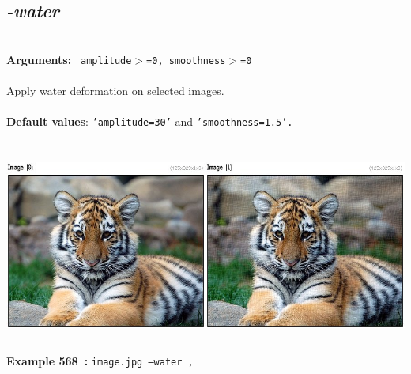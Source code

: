 \documentclass[a4paper,11pt,twoside]{book}
\begin{document}
\subsection{\emph{-water} }\vspace*{-0.5em}
~\\\textbf{Arguments: } 
{\small \texttt{\_amplitude$>$=0,\_smoothness$>$=0}}\\~\\
Apply water deformation on selected images.
~\\~\\\textbf{Default values}: {\small \texttt{'amplitude=30'} and \texttt{'smoothness=1.5'.}}
\begin{center}\includegraphics[keepaspectratio=true,height=7cm,width=\textwidth]{img/gmic_def568.jpg}\\
{\footnotesize \textbf{Example 568~:} \texttt{image.jpg --water ,}}
\end{center}
\end{document}

